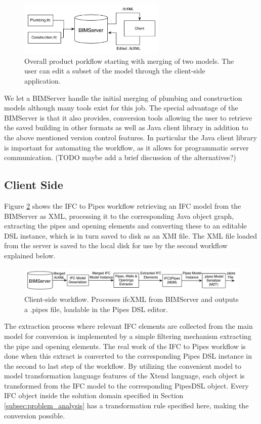 \begin{figure}[t]
    \centering
        \includegraphics[width=70mm]{images/CompleteWorkflow.pdf}
    \caption{Overall product porkflow starting with merging of two models. The user can edit a subset of the model through the client-side application.}
    \label{fig:overall_product_workflow}
\end{figure}

We let a BIMServer handle the initial merging of plumbing and construction models although many tools exist for this job. The special advantage of the BIMServer is that it also provides, conversion tools allowing the user to retrieve the saved building in other formats as well as Java client library in addition to the above mentioned version control features. In particular the Java client library is important for automating the workflow, as it allows for programmatic server communication. (TODO maybe add a brief discussion of the alternatives?)

\subsection{Client Side}
Figure \ref{fig:IFC2PipesWorkflow} shows the IFC to Pipes workflow retrieving an IFC model from the BIMServer as XML, processing it to the corresponding Java object graph, extracting the pipes and opening elements and converting these to an editable DSL instance, which is in turn saved to disk as an XMI file. The XML file loaded from the server is saved to the local disk for use by the second workflow explained below.

\begin{figure}[t]
    \centering
        \includegraphics[width=120mm]{images/IFC2Pipes.pdf}
    \caption{Client-side workflow. Processes ifcXML from BIMServer and outputs a .pipes file, loadable in the Pipes DSL editor.}
    \label{fig:IFC2PipesWorkflow}
\end{figure}

The extraction process where relevant IFC elements are collected from the main model for conversion is implemented by a simple filtering mechanism extracting the pipe and opening elements. The real work of the IFC to Pipes workflow is done when this extract is converted to the corresponding Pipes DSL instance in the second to last step of the workflow. By utilizing the convenient model to model transformation language features of the Xtend language, each object is transformed from the IFC model to the corresponding PipesDSL object. Every IFC object inside the solution domain specified in Section \ref{subsec:problem_analysis} has a transformation rule specified here, making the conversion possible.

